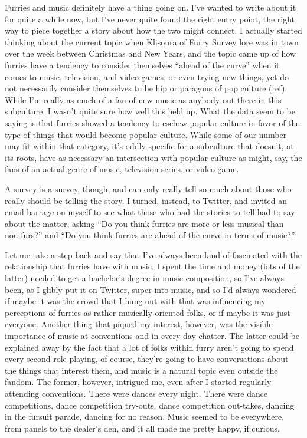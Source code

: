 
Furries and music definitely have a thing going on. I've wanted to write about it for quite a while now, but I've never quite found the right entry point, the right way to piece together a story about how the two might connect. I actually started thinking about the current topic when Klisoura of Furry Survey lore was in town over the week between Christmas and New Years, and the topic came up of how furries have a tendency to consider themselves ``ahead of the curve'' when it comes to music, television, and video games, or even trying new things, yet do not necessarily consider themselves to be hip or paragons of pop culture (ref). While I'm really as much of a fan of new music as anybody out there in this subculture, I wasn't quite sure how well this held up. What the data seem to be saying is that furries showed a tendency to eschew popular culture in favor of the type of things that would become popular culture. While some of our number may fit within that category, it's oddly specific for a subculture that doesn't, at its roots, have as necessary an intersection with popular culture as might, say, the fans of an actual genre of music, television series, or video game.

A survey is a survey, though, and can only really tell so much about those who really should be telling the story. I turned, instead, to Twitter, and invited an email barrage on myself to see what those who had the stories to tell had to say about the matter, asking ``Do you think furries are more or less musical than non-furs?'' and ``Do you think furries are ahead of the curve in terms of music?''.

Let me take a step back and say that I've always been kind of fascinated with the relationship that furries have with music. I spent the time and money (lots of the latter) needed to get a bachelor's degree in music composition, so I've always been, as I glibly put it on Twitter, super into music, and so I'd always wondered if maybe it was the crowd that I hung out with that was influencing my perceptions of furries as rather musically oriented folks, or if maybe it was just everyone. Another thing that piqued my interest, however, was the visible importance of music at conventions and in every-day chatter. The latter could be explained away by the fact that a lot of folks within furry aren't going to spend every second role-playing, of course, they're going to have conversations about the things that interest them, and music is a natural topic even outside the fandom. The former, however, intrigued me, even after I started regularly attending conventions. There were dances every night. There were dance competitions, dance competition try-outs, dance competition out-takes, dancing in the fursuit parade, dancing for no reason. Music seemed to be everywhere, from panels to the dealer's den, and it all made me pretty happy, if curious.

